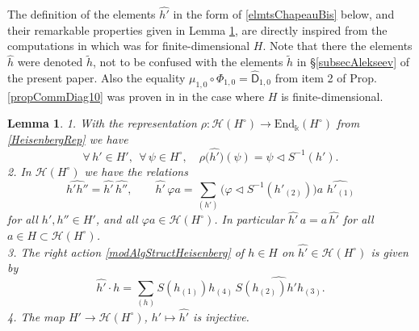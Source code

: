 \documentclass[11pt]{amsart}
\newtheorem{lem}[teo]{Lemma}
\begin{document}
The definition of the elements $\widehat{h'}$ in the form of \eqref{elmtsChapeauBis} below, and their remarkable properties given in Lemma \ref{lemmeChapeau}, are directly inspired from the computations in \cite[Lem.\,4.1, also see \S 2.2]{FaitgMCG} which was for finite-dimensional $H$. Note that there the elements $\widehat{h}$ were denoted $\widetilde{h}$, not to be confused with the elements $\widetilde{h}$ in \S\ref{subsecAlekseev} of the present paper. Also the equality $\mu_{1,0} \circ \Phi_{1,0} = \widehat{\mathsf{D}}_{1,0}$ from item 2 of Prop.\,\ref{propCommDiag10} was proven in \cite[eq.\,(4.22)]{FaitgThesis} in the case where $H$ is finite-dimensional.

\begin{lem}\label{lemmeChapeau}
1. With the representation $\rho : \mathcal{H}(H^\circ) \to \mathrm{End}_\Bbbk(H^\circ)$ from \eqref{HeisenbergRep} we have
\begin{equation}\label{formuleRepChapeau}
\forall \, h' \in H', \:\: \forall \, \psi \in H^\circ, \quad \rho\bigl( \widehat{h'} \bigr)(\psi) = \psi \lhd S^{-1}(h').
\end{equation}
2. In $\mathcal{H}(H^\circ)$ we have the relations
\[ \textstyle \widehat{h'h''} = \widehat{h'} \, \widehat{h''}, \qquad \widehat{h'}\,\varphi a = \sum_{(h')} \bigl( \varphi \lhd S^{-1}(h'_{(2)}) \bigr)a \, \widehat{\,h'_{(1)}} \]
for all $h', h'' \in H'$, and all $\varphi a \in \mathcal{H}(H^\circ)$. In particular $\widehat{h'} \, a = a \, \widehat{h'}$ for all $a \in H \subset \mathcal{H}(H^\circ)$.
\\3. The right action \eqref{modAlgStructHeisenberg} of $h \in H$ on $\widehat{h'} \in \mathcal{H}(H^\circ)$ is given by
\[ \widehat{h'} \cdot h = \textstyle \sum_{(h)} S(h_{(1)})h_{(4)} \, \widehat{S(h_{(2)})h'h_{(3)}}. \]
4. The map $H' \to \mathcal{H}(H^\circ)$, $h' \mapsto \widehat{h'}$ is injective.
\end{lem}
\end{document}
